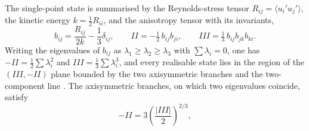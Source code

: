 \documentclass[lineno]{JFM-FLM_Au}
\begin{document}
The single-point state is summarised by the Reynolds-stress tensor
$R_{ij} = \langle u_i'u_j'\rangle$, the kinetic energy
$k = \tfrac{1}{2}R_{ii}$, and the anisotropy tensor with its invariants,
\begin{equation}
  b_{ij} = \frac{R_{ij}}{2k} - \frac{1}{3}\delta_{ij},
  \qquad
  II = -\tfrac{1}{2}\,b_{ij}b_{ji},
  \qquad
  III = \tfrac{1}{3}\,b_{ij}b_{jk}b_{ki}.
  \label{eq:anisotropy}
\end{equation}
Writing the eigenvalues of $b_{ij}$ as $\lambda_1\ge\lambda_2\ge\lambda_3$
with $\sum\lambda_i = 0$, one has
$-II = \tfrac{1}{2}\sum\lambda_i^2$ and
$III = \tfrac{1}{3}\sum\lambda_i^3$, and every realisable state lies in
the region of the $(III,-II)$ plane bounded by the two axisymmetric
branches and the two-component line \citep{LumleyNewman1977,Banerjee2007}.
The axisymmetric branches, on which two eigenvalues coincide, satisfy
\begin{equation}
  -II = 3\left(\frac{|III|}{2}\right)^{2/3},
  \label{eq:lumley_boundary}
\end{equation}
\end{document}
